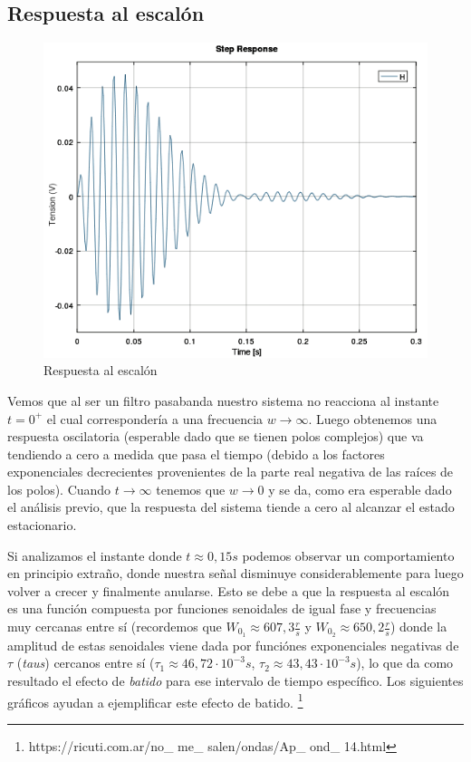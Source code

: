 \documentclass[11pt,a4paper]{report}
\begin{document}
\subsection*{Respuesta al escalón}

\begin{figure}[h!]
\includegraphics[scale=0.7]{RtaEscalon.png}
\caption{Respuesta al escalón}
\end{figure}

Vemos que al ser un filtro pasabanda nuestro sistema no reacciona al instante 
$t=0^{+}$ el cual correspondería a una frecuencia $w\longrightarrow \infty$.
Luego obtenemos una respuesta oscilatoria (esperable dado que se tienen polos
complejos) que va tendiendo a cero a medida que pasa el tiempo (debido a los factores
exponenciales decrecientes provenientes de la parte real negativa de las raíces de los polos). Cuando $t\longrightarrow \infty$ tenemos que $w\longrightarrow 0$ y
se da, como era esperable dado el análisis previo, que la respuesta del sistema tiende a cero al alcanzar el estado estacionario.

\bigskip
Si analizamos el instante donde $t \approx 0,15s$ podemos observar un comportamiento en principio extraño, donde nuestra señal disminuye considerablemente para luego volver a crecer y finalmente anularse. Esto se debe a que la respuesta al escalón es una función compuesta por funciones senoidales de igual fase y frecuencias muy cercanas entre sí (recordemos que $W_{0_{1}} \approx 607,3\frac{r}{s}$ y $W_{0_{2}} \approx 650,2\frac{r}{s}$) donde la amplitud de estas senoidales viene dada por funciónes exponenciales negativas de $\tau$ (\textit{taus}) cercanos entre sí ($\tau_{1} \approx 46,72 \cdot 10^{-3} s$, $\tau_{2} \approx 43,43 \cdot 10^{-3} s$), lo que da como resultado el efecto de \textit{batido} para ese intervalo de tiempo específico. Los siguientes gráficos ayudan a ejemplificar este efecto de batido. \footnote{https://ricuti.com.ar/no\_ me\_ salen/ondas/Ap\_ ond\_ 14.html}
\end{document}
